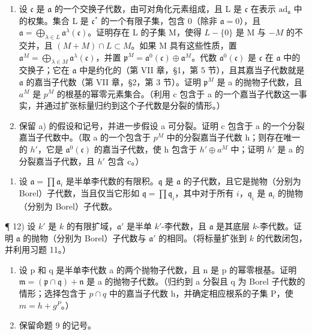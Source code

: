 \begin{enumerate}
\def\labelenumi{\alph{enumi})}
\item
  设 \(\mathfrak{c}\) 是 \(\mathfrak{a}\) 的一个交换子代数，由可对角化元素组成，且 L 是 \(\mathfrak{c}\) 在表示 \(\mathrm{ad}_{\mathfrak{a}}\) 中的权集。集合 L 是 \(\mathfrak{c}^*\) 的一个有限子集，包含 0（除非 \(\mathfrak{a} = 0\)），且 \(\mathfrak{a} = \bigoplus_{\lambda \in L} \mathfrak{a}^{\lambda}(\mathfrak{c})\)。证明存在 L 的子集 M，使得 \(L - \{0\}\) 是 M 与 \(-M\) 的不交并，且 \((M + M) \cap L \subset M\)。如果 M 具有这些性质，置 \(\mathfrak{a}^{M} = \bigoplus_{\lambda \in M} \mathfrak{a}^{\lambda}(\mathfrak{c})\)，并置 \(\mathfrak{p}^{M} = \mathfrak{a}^{0}(\mathfrak{c}) \oplus \mathfrak{a}^{M}\)。代数 \(\mathfrak{a}^{0}(\mathfrak{c})\) 是 \(\mathfrak{c}\) 在 \(\mathfrak{a}\) 中的交换子；它在 \(\mathfrak{a}\) 中是约化的（第 VII 章，§1，第 5 节），且其嘉当子代数就是 \(\mathfrak{a}\) 的嘉当子代数（第 VII 章，§2，第 3 节）。证明 \(\mathfrak{p}^{M}\) 是 a 的抛物子代数，且 \(a^{M}\) 是 \(p^{M}\) 的根基的幂零元素集合。（利用 c 包含于 a 的一个嘉当子代数这一事实，并通过扩张标量归约到这个子代数是分裂的情形。）
\item
  保留 a) 的假设和记号，并进一步假设 a 可分裂。证明 c 包含于 a 的一个分裂嘉当子代数中。（取 a 的一个包含于 \(p^{M}\) 中的分裂嘉当子代数 h；则存在唯一的 \(h'\)，它是 \(\mathfrak{a}^{0}(\mathfrak{c})\) 的嘉当子代数，使 h 包含于 \(h' \oplus a^{M}\) 中；证明 \(h'\) 是 a 的分裂嘉当子代数，且 \(h'\) 包含 c。）
\end{enumerate}

\begin{enumerate}
\def\labelenumi{\arabic{enumi})}
\setcounter{enumi}{10}
\tightlist
\item
  设 \(\mathfrak{a} = \prod \mathfrak{a}_i\) 是半单李代数的有限积。\(\mathfrak{q}\) 是 \(\mathfrak{a}\) 的子代数，且它是抛物（分别为 Borel）子代数，当且仅当它形如 \(\mathfrak{q} = \prod \mathfrak{q}_i\)，其中对于所有 \(i\)，\(\mathfrak{q}_i\) 是 \(\mathfrak{a}_i\) 的抛物（分别为 Borel）子代数。
\end{enumerate}

¶ 12) 设 \(k'\) 是 \(k\) 的有限扩域，\(\mathfrak{a}'\) 是半单 \(k'\)-李代数，且 \(\mathfrak{a}\) 是其底层 \(k\)-李代数。证明 \(\mathfrak{a}\) 的抛物（分别为 Borel）子代数与 \(\mathfrak{a}'\) 的相同。（将标量扩张到 \(k\) 的代数闭包，并利用习题 11。）

\begin{enumerate}
\def\labelenumi{\arabic{enumi})}
\setcounter{enumi}{12}
\item
  设 p 和 q 是半单李代数 a 的两个抛物子代数，且 n 是 p 的幂零根基。证明 \(\mathfrak{m} = (\mathfrak{p} \cap \mathfrak{q}) + \mathfrak{n}\) 是 a 的抛物子代数。（归约到 a 分裂且 q 为 Borel 子代数的情形；选择包含于 \(p \cap q\) 中的嘉当子代数 h，并确定相应根系的子集 P，使 \(m = h + g^{P}\)。）
\item
保留命题 9 的记号。
\end{enumerate}

